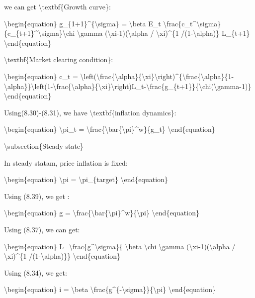 \documentclass[10pt,math=newtx,citestyle=gb7714-2015,bibstyle=gb7714-2015]{elegantbook}
\begin{document}
	we can get \textbackslash{}textbf\{Growth curve\}:
	
	\textbackslash{}begin\{equation\}
	g\_\{1+1\}\^{}\{\textbackslash{}sigma\} = \textbackslash{}beta E\_t \textbackslash{}frac\{c\_t\^{}\textbackslash{}sigma\}\{c\_\{t+1\}\^{}\textbackslash{}sigma\}\textbackslash{}chi \textbackslash{}gamma (\textbackslash{}xi-1)(\textbackslash{}alpha / \textbackslash{}xi)\^{}\{1 /(1-\textbackslash{}alpha)\} L\_\{t+1\}
	\textbackslash{}end\{equation\}
	
	\textbackslash{}textbf\{Market clearing condition\}:
	
	\textbackslash{}begin\{equation\}
	c\_t =  \textbackslash{}left(\textbackslash{}frac\{\textbackslash{}alpha\}\{\textbackslash{}xi\}\textbackslash{}right)\^{}\{\textbackslash{}frac\{\textbackslash{}alpha\}\{1-\textbackslash{}alpha\}\}\textbackslash{}left(1-\textbackslash{}frac\{\textbackslash{}alpha\}\{\textbackslash{}xi\}\textbackslash{}right)L\_t-\textbackslash{}frac\{g\_\{t+1\}\}\{\textbackslash{}chi(\textbackslash{}gamma-1)\}
	\textbackslash{}end\{equation\}
	
	Using(8.30)-(8.31), we have \textbackslash{}textbf\{inflation dynamics\}:
	
	\textbackslash{}begin\{equation\}
	\textbackslash{}pi\_t = \textbackslash{}frac\{\textbackslash{}bar\{\textbackslash{}pi\}\^{}w\}\{g\_t\} 
	\textbackslash{}end\{equation\}
	
	\textbackslash{}subsection\{Steady state\}
	
	In steady statam, price inflation is fixed:
	
	\textbackslash{}begin\{equation\}
	\textbackslash{}pi = \textbackslash{}pi\_\{target\}
	\textbackslash{}end\{equation\}
	
	Using (8.39), we get :
	
	\textbackslash{}begin\{equation\}
	g = \textbackslash{}frac\{\textbackslash{}bar\{\textbackslash{}pi\}\^{}w\}\{\textbackslash{}pi\}
	\textbackslash{}end\{equation\}
	
	Using (8.37), we can get:
	
	\textbackslash{}begin\{equation\}
	L=\textbackslash{}frac\{g\^{}\textbackslash{}sigma\}\{ \textbackslash{}beta \textbackslash{}chi \textbackslash{}gamma (\textbackslash{}xi-1)(\textbackslash{}alpha / \textbackslash{}xi)\^{}\{1 /(1-\textbackslash{}alpha)\}\}
	\textbackslash{}end\{equation\}
	
	Using (8.34), we get:
	
	\textbackslash{}begin\{equation\}
	i = \textbackslash{}beta \textbackslash{}frac\{g\^{}\{-\textbackslash{}sigma\}\}\{\textbackslash{}pi\}
	\textbackslash{}end\{equation\}
	
\end{document}
